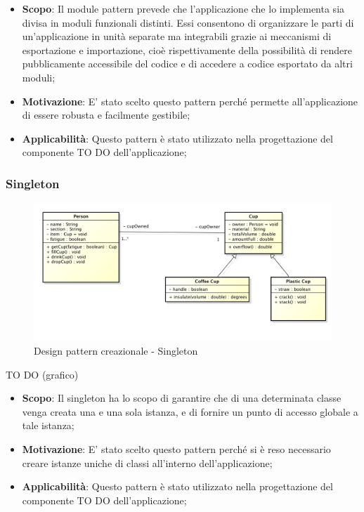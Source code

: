 		
		\begin{itemize}
			\item \textbf{Scopo}: Il module pattern prevede che l'applicazione che lo implementa sia divisa in moduli funzionali distinti. Essi consentono di organizzare le parti di un’applicazione in unità separate ma integrabili grazie ai meccanismi di esportazione e importazione, cioè rispettivamente della possibilità di rendere pubblicamente accessibile del codice e di accedere a codice esportato da altri moduli;
			
			\item \textbf{Motivazione}: E' stato scelto questo pattern perché permette all'applicazione di essere robusta e facilmente gestibile;
			
			\item \textbf{Applicabilità}: Questo pattern è stato utilizzato nella progettazione del componente TO DO dell'applicazione;
			
		\end{itemize}


		\newpage
		\subsubsection{Singleton} %
		
		\begin{figure}[htbp]
			\centering
			\centerline{\includegraphics[scale=0.3]{./images/example_graph.png}}
			\caption{Design pattern creazionale - Singleton}
		\end{figure}
		TO DO (grafico)
		
		
		\begin{itemize}
			\item \textbf{Scopo}: Il singleton ha lo scopo di garantire che di una determinata classe venga creata una e una sola istanza, e di fornire un punto di accesso globale a tale istanza;
						
			\item \textbf{Motivazione}: E' stato scelto questo pattern perché si è reso necessario creare istanze uniche di classi all'interno dell'applicazione;
			
			\item \textbf{Applicabilità}: Questo pattern è stato utilizzato nella progettazione del componente TO DO dell'applicazione;
		\end{itemize}
		
